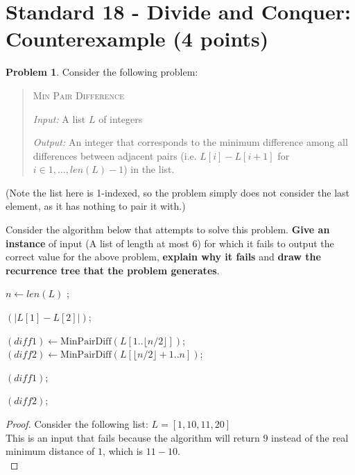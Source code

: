 \documentclass[11pt]{article}
\theoremstyle{definition}
\theoremstyle{definition}
\newtheorem{required}{Problem}
\theoremstyle{definition}
\begin{document}
\section{Standard 18 - Divide and Conquer: Counterexample (4 points)}
\begin{required} \label{dandc}
Consider the following problem:
\begin{quotation}
\noindent \textsc{Min Pair Difference}

\noindent \textit{Input:} A list $L$ of integers

\noindent \textit{Output:} An integer that corresponds to the minimum difference among all differences between adjacent pairs (i.e.  $L[i]-L[i+1]$ for $i\in{1,\dots,len(L)-1}$) in the list.
\end{quotation}
(Note the list here is 1-indexed, so the problem simply does not consider the last element, as it has nothing to pair it with.)

Consider the algorithm below that attempts to solve this problem. \textbf{Give an instance} of input (A list of length at most 6) for which it fails to output the correct value for the above problem, \textbf{explain why it fails} and \textbf{draw the recurrence tree that the problem generates}.

\begin{algorithm}
\caption{Proposed divide-and-conquer algorithm for the Min Pair Difference problem}
\begin{algorithmic}[1]
$n \gets len(L)$
\Return;
\EndIf

\Return $(|L[1] - L[2]|)$;
\EndIf


\State $(diff1) \gets \text{MinPairDiff}(L[1..\lfloor n/2 \rfloor])$;
\State $(diff2) \gets \text{MinPairDiff}(L[\lfloor n/2 \rfloor + 1..n])$;



\State \Return $(diff1)$;
\Else

\State \Return $(diff2)$;

\EndIf
\EndProcedure
\end{algorithmic}
\end{algorithm}

\begin{proof}
Consider the following list: $L = [1, 10, 11, 20]$\\

This is an input that fails because the algorithm will return $9$ instead of the real minimum distance of $1$, which is $11 - 10$. \\


\end{proof}
\end{required}
\end{document}
